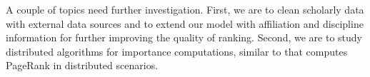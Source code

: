 \documentclass[10pt,conference,letterpaper]{IEEEtran}
\newcommand{\eat}[1]{}
\newcounter{alg}[section]
\newcommand{\stitle}[1]{\vspace{0.75ex}\noindent{\bf #1}}
\begin{document}
A couple of topics need further investigation. First, we are to clean scholarly data with external data sources
and to extend our model with affiliation and discipline information for further improving the quality of ranking.
Second, we are to study distributed algorithms for importance computations, similar to \cite{ZhuYL05} that computes PageRank in distributed scenarios.




\eat{%
\stitle{Acknowledgments}.
This work is supported in part by  973 program ({\small No. 2014CB340300}), NSFC ({\small No. 61322207\&61421003}),  Special Funds of Beijing Municipal Science \& Technology Commission, and MSRA Collaborative Research Program. We also thank Liang Duan, Niannian Wu and Dr. Xuelian Lin for their support.
}%


%

\balance


\begin{small}

\end{small}

%
%


\end{document}

